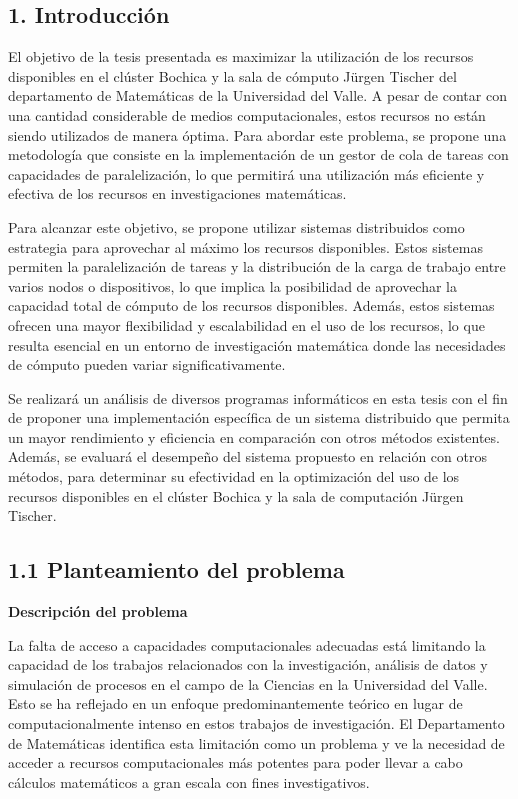 \begin{spacing}{1.5}
  \begin{tightcenter}
    \section{1. Introducción}
    \mylinespacing
  \end{tightcenter}

  El objetivo de la tesis presentada es maximizar la utilización de los recursos disponibles en el clúster Bochica y la sala de cómputo Jürgen Tischer del departamento de Matemáticas de la Universidad del Valle. A pesar de contar con una cantidad considerable de medios computacionales, estos recursos no están siendo utilizados de manera óptima. Para abordar este problema, se propone una metodología que consiste en la implementación de un gestor de cola de tareas con capacidades de paralelización, lo que permitirá una utilización más eficiente y efectiva de los recursos en investigaciones matemáticas.

  Para alcanzar este objetivo, se propone utilizar sistemas distribuidos como estrategia para aprovechar al máximo los recursos disponibles. Estos sistemas permiten la paralelización de tareas y la distribución de la carga de trabajo entre varios nodos o dispositivos, lo que implica la posibilidad de aprovechar la capacidad total de cómputo de los recursos disponibles. Además, estos sistemas ofrecen una mayor flexibilidad y escalabilidad en el uso de los recursos, lo que resulta esencial en un entorno de investigación matemática donde las necesidades de cómputo pueden variar significativamente.
  
  Se realizará un análisis de diversos programas informáticos en esta tesis con el fin de proponer una implementación específica de un sistema distribuido que permita un mayor rendimiento y eficiencia en comparación con otros métodos existentes. Además, se evaluará el desempeño del sistema propuesto en relación con otros métodos, para determinar su efectividad en la optimización del uso de los recursos disponibles en el clúster Bochica y la sala de computación Jürgen Tischer.

  \subsection{1.1 Planteamiento del problema}

  \textbf{Descripción del problema}

  La falta de acceso a capacidades computacionales adecuadas está limitando la capacidad de los trabajos relacionados con la investigación, análisis de datos y simulación de procesos en el campo de la Ciencias en la Universidad del Valle. Esto se ha reflejado en un enfoque predominantemente teórico en lugar de computacionalmente intenso en estos trabajos de investigación. El Departamento de Matemáticas identifica esta limitación como un problema y ve la necesidad de acceder a recursos computacionales más potentes para poder llevar a cabo cálculos matemáticos a gran escala con fines investigativos.


\end{spacing}
